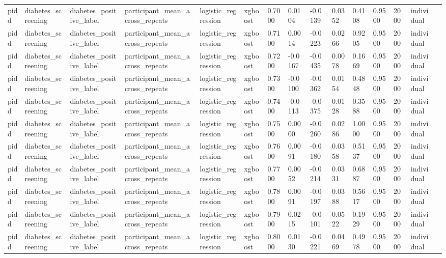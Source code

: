 \begin{tabular}{lllllllllllllll}
pidd & diabetes\_screening & diabetes\_positive\_label & participant\_mean\_across\_repeats & logistic\_regression & xgboost & 0.7000 & 0.0104 & -0.0139 & 0.0352 & 0.4108 & 0.9500 & 2000 & individual &  \\
pidd & diabetes\_screening & diabetes\_positive\_label & participant\_mean\_across\_repeats & logistic\_regression & xgboost & 0.7100 & 0.0014 & -0.0223 & 0.0266 & 0.9205 & 0.9500 & 2000 & individual &  \\
pidd & diabetes\_screening & diabetes\_positive\_label & participant\_mean\_across\_repeats & logistic\_regression & xgboost & 0.7200 & -0.0167 & -0.0435 & 0.0078 & 0.1669 & 0.9500 & 2000 & individual &  \\
pidd & diabetes\_screening & diabetes\_positive\_label & participant\_mean\_across\_repeats & logistic\_regression & xgboost & 0.7300 & -0.0100 & -0.0362 & 0.0154 & 0.4848 & 0.9500 & 2000 & individual &  \\
pidd & diabetes\_screening & diabetes\_positive\_label & participant\_mean\_across\_repeats & logistic\_regression & xgboost & 0.7400 & -0.0113 & -0.0375 & 0.0128 & 0.3588 & 0.9500 & 2000 & individual &  \\
pidd & diabetes\_screening & diabetes\_positive\_label & participant\_mean\_across\_repeats & logistic\_regression & xgboost & 0.7500 & 0.0000 & -0.0260 & 0.0286 & 1.0000 & 0.9500 & 2000 & individual &  \\
pidd & diabetes\_screening & diabetes\_positive\_label & participant\_mean\_across\_repeats & logistic\_regression & xgboost & 0.7600 & 0.0091 & -0.0180 & 0.0358 & 0.5137 & 0.9500 & 2000 & individual &  \\
pidd & diabetes\_screening & diabetes\_positive\_label & participant\_mean\_across\_repeats & logistic\_regression & xgboost & 0.7700 & 0.0052 & -0.0214 & 0.0331 & 0.6887 & 0.9500 & 2000 & individual &  \\
pidd & diabetes\_screening & diabetes\_positive\_label & participant\_mean\_across\_repeats & logistic\_regression & xgboost & 0.7800 & 0.0091 & -0.0197 & 0.0388 & 0.5617 & 0.9500 & 2000 & individual &  \\
pidd & diabetes\_screening & diabetes\_positive\_label & participant\_mean\_across\_repeats & logistic\_regression & xgboost & 0.7900 & 0.0215 & -0.0101 & 0.0522 & 0.1929 & 0.9500 & 2000 & individual &  \\
pidd & diabetes\_screening & diabetes\_positive\_label & participant\_mean\_across\_repeats & logistic\_regression & xgboost & 0.8000 & 0.0130 & -0.0221 & 0.0469 & 0.4978 & 0.9500 & 2000 & individual &  \\

\end{tabular}
